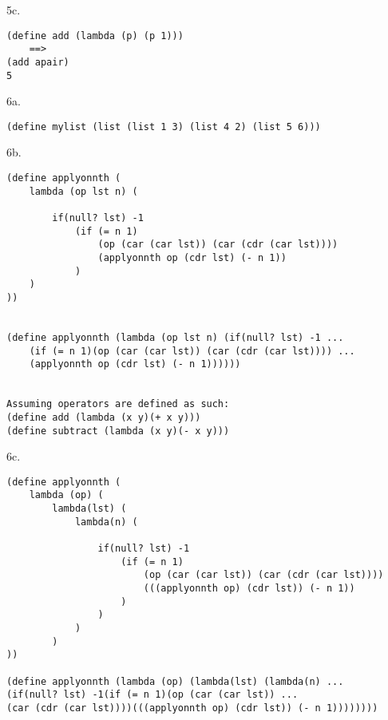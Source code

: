 \documentclass[12pt]{article}
\begin{document}
\noindent 5c.
\begin{lstlisting}
(define add (lambda (p) (p 1)))
    ==>
(add apair)
5
\end{lstlisting}

\pagebreak

\noindent 6a.
\begin{lstlisting}
(define mylist (list (list 1 3) (list 4 2) (list 5 6)))
\end{lstlisting}



\noindent 6b.
\begin{lstlisting}
(define applyonnth (
	lambda (op lst n) (
		
		if(null? lst) -1
			(if (= n 1)
				(op (car (car lst)) (car (cdr (car lst))))
				(applyonnth op (cdr lst) (- n 1))
			)
	)
))


(define applyonnth (lambda (op lst n) (if(null? lst) -1 ...
	(if (= n 1)(op (car (car lst)) (car (cdr (car lst)))) ...
	(applyonnth op (cdr lst) (- n 1))))))


Assuming operators are defined as such:
(define add (lambda (x y)(+ x y)))
(define subtract (lambda (x y)(- x y)))
\end{lstlisting}

\noindent 6c.
\begin{lstlisting}
(define applyonnth (
    lambda (op) (
        lambda(lst) (
            lambda(n) (
		
                if(null? lst) -1
                    (if (= n 1)
                        (op (car (car lst)) (car (cdr (car lst))))
                        (((applyonnth op) (cdr lst)) (- n 1))
                    )
                )
            )
        )
))

(define applyonnth (lambda (op) (lambda(lst) (lambda(n) ...
(if(null? lst) -1(if (= n 1)(op (car (car lst)) ...
(car (cdr (car lst))))(((applyonnth op) (cdr lst)) (- n 1))))))))
\end{lstlisting}




\end{document}
